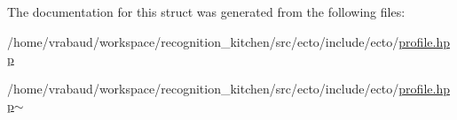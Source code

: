 The documentation for this struct was generated from the following files\-:\begin{DoxyCompactItemize}
\item 
/home/vrabaud/workspace/recognition\-\_\-kitchen/src/ecto/include/ecto/\hyperlink{profile_8hpp}{profile.\-hpp}\item 
/home/vrabaud/workspace/recognition\-\_\-kitchen/src/ecto/include/ecto/\hyperlink{profile_8hpp~}{profile.\-hpp$\sim$}\end{DoxyCompactItemize}
